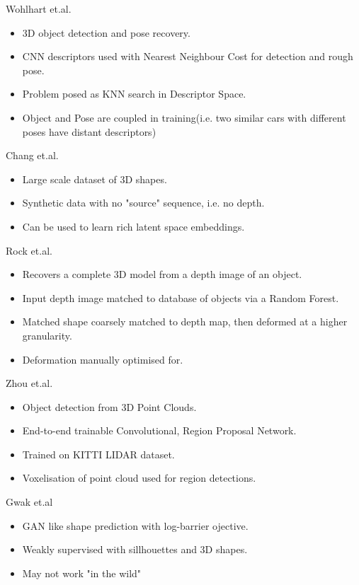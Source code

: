 Wohlhart et.al. \cite{Wohlhart2015}
\begin{itemize}
	\item 3D object detection and pose recovery.
	\item CNN descriptors used with Nearest Neighbour Cost for detection and rough pose.
	\item Problem posed as KNN search in Descriptor Space.
	\item Object and Pose are coupled in training(i.e. two similar cars with different poses have distant descriptors)
\end{itemize}

Chang et.al. \cite{Chang2015}
\begin{itemize}
	\item Large scale dataset of 3D shapes.
	\item Synthetic data with no "source" sequence, i.e. no depth.
	\item Can be used to learn rich latent space embeddings.
\end{itemize}

Rock et.al. \cite{Rock2015}
\begin{itemize}
	\item Recovers a complete 3D model from a depth image of an object.
	\item Input depth image matched to database of objects via a Random Forest.
	\item Matched shape coarsely matched to depth map, then deformed at a higher granularity.
	\item Deformation manually optimised for.
\end{itemize}

Zhou et.al. \cite{Zhou2017_2}
\begin{itemize}
	\item Object detection from 3D Point Clouds.
	\item End-to-end trainable Convolutional, Region Proposal Network.
	\item Trained on KITTI LIDAR dataset. \cite{Geiger2013}
	\item Voxelisation of point cloud used for region detections.
\end{itemize}

Gwak et.al \cite{Gwak2017}
\begin{itemize}
	\item GAN like shape prediction with log-barrier ojective.
	\item Weakly supervised with sillhouettes and 3D shapes.
	\item May not work "in the wild"
\end{itemize}

